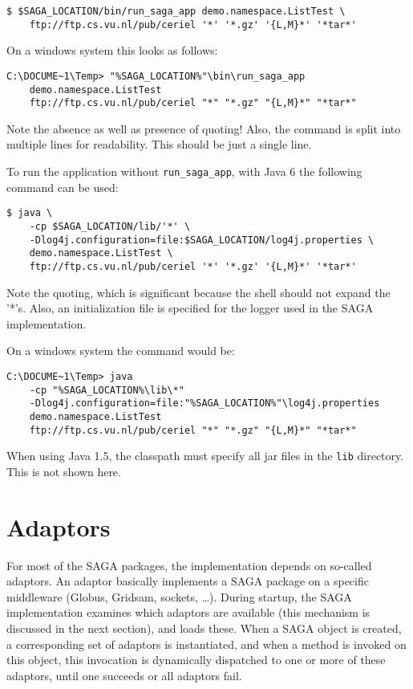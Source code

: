 \documentclass[a4paper,10pt]{article}
\begin{document}
\noindent
{\small
\begin{verbatim}
$ $SAGA_LOCATION/bin/run_saga_app demo.namespace.ListTest \
    ftp://ftp.cs.vu.nl/pub/ceriel '*' '*.gz' '{L,M}*' '*tar*'
\end{verbatim}
}
\noindent

On a windows system this looks as follows:

\noindent
{\small
\begin{verbatim}
C:\DOCUME~1\Temp> "%SAGA_LOCATION%"\bin\run_saga_app
    demo.namespace.ListTest
    ftp://ftp.cs.vu.nl/pub/ceriel "*" "*.gz" "{L,M}*" "*tar*"
\end{verbatim}
}
\noindent

Note the absence as well as presence of quoting! Also, the
command is split into multiple lines for readability.
This should be just a single line.

To run the application without \texttt{run\_saga\_app},
with Java 6 the following command can be used:

\noindent
{\small
\begin{verbatim}
$ java \
    -cp $SAGA_LOCATION/lib/'*' \
    -Dlog4j.configuration=file:$SAGA_LOCATION/log4j.properties \
    demo.namespace.ListTest \
    ftp://ftp.cs.vu.nl/pub/ceriel '*' '*.gz' '{L,M}*' '*tar*'
\end{verbatim}
}
\noindent

Note the quoting, which is significant because the shell should not expand
the '*'s. Also, an initialization file is specified for the logger used in the
SAGA implementation.

On a windows system the command would be:

\noindent
{\small
\begin{verbatim}
C:\DOCUME~1\Temp> java
    -cp "%SAGA_LOCATION%\lib\*"
    -Dlog4j.configuration=file:"%SAGA_LOCATION%"\log4j.properties
    demo.namespace.ListTest
    ftp://ftp.cs.vu.nl/pub/ceriel "*" "*.gz" "{L,M}*" "*tar*"
\end{verbatim}
}
\noindent

When using Java 1.5, the classpath must specify all jar files in the
\texttt{lib} directory. This is not shown here.

\section{Adaptors}

For most of the SAGA packages, the implementation depends on so-called
adaptors. An adaptor basically implements a SAGA package on a specific
middleware (Globus, Gridsam, sockets, \ldots).
During startup, the SAGA implementation examines which adaptors are
available (this mechanism is discussed in the next section), and loads
these. When a SAGA object is created, a corresponding set of adaptors
is instantiated, and when a
method is invoked on this object, this invocation is dynamically
dispatched to one or more of these adaptors, until one succeeds
or all adaptors fail.
\end{document}
